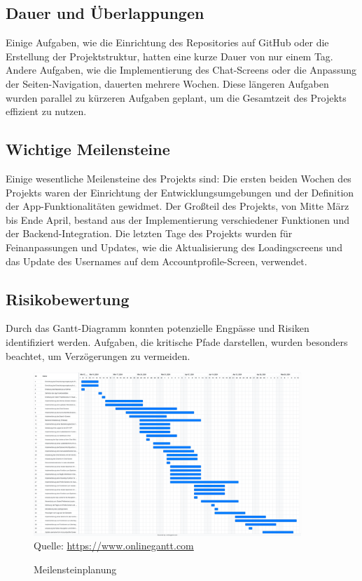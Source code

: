\subsection{Dauer und Überlappungen}
Einige Aufgaben, wie die Einrichtung des Repositories auf GitHub oder die Erstellung der Projektstruktur, hatten eine kurze Dauer von nur einem Tag. Andere Aufgaben, wie die Implementierung des Chat-Screens oder die Anpassung der Seiten-Navigation, dauerten mehrere Wochen. Diese längeren Aufgaben wurden parallel zu kürzeren Aufgaben geplant, um die Gesamtzeit des Projekts effizient zu nutzen.

\subsection{Wichtige Meilensteine}
Einige wesentliche Meilensteine des Projekts sind:
Die ersten beiden Wochen des Projekts waren der Einrichtung der Entwicklungsumgebungen und der Definition der App-Funktionalitäten gewidmet.
Der Großteil des Projekts, von Mitte März bis Ende April, bestand aus der Implementierung verschiedener Funktionen und der Backend-Integration.
Die letzten Tage des Projekts wurden für Feinanpassungen und Updates, wie die Aktualisierung des Loadingscreens und das Update des Usernames auf dem Accountprofile-Screen, verwendet.

\subsection{Risikobewertung}
Durch das Gantt-Diagramm konnten potenzielle Engpässe und Risiken identifiziert werden. Aufgaben, die kritische Pfade darstellen, wurden besonders beachtet, um Verzögerungen zu vermeiden.

\begin{figure}[H]
    \caption[Meilensteinplanung]{Meilensteinplanung}
    \includegraphics[width=0.9\textwidth]{assets/figures/STH GANTT Diagramm.png}
    \\
    Quelle: \url{https://www.onlinegantt.com}
\end{figure}